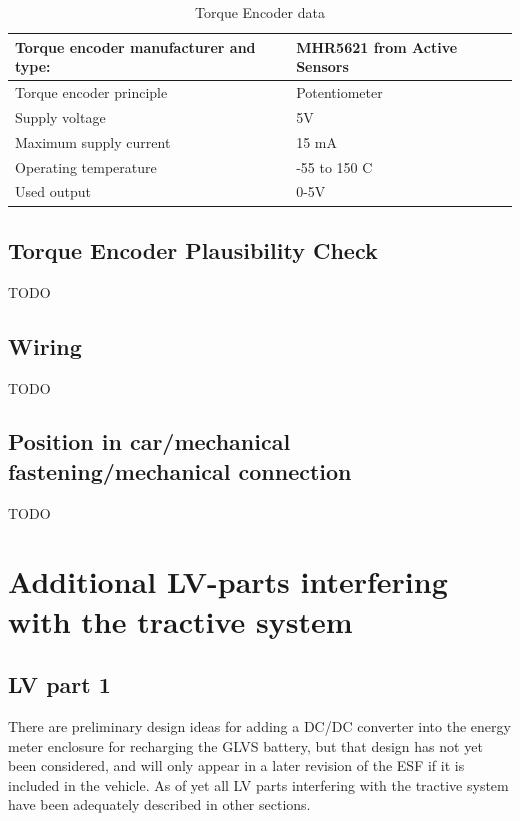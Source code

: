 \documentclass{article}
\begin{document}
\begin{table}[H]
	\centering
	\begin{tabular}{|l|l|}
	\hline
	Torque encoder manufacturer and type: & MHR5621 from Active Sensors \\ \hline
	Torque encoder principle & Potentiometer \\ \hline
	Supply voltage & 5V \\ \hline
	Maximum supply current & 15 mA \\ \hline
	Operating temperature & -55 to 150 \degree C \\ \hline
	Used output & 0-5V \\ \hline
	\end{tabular}
	\caption{Torque Encoder data}
	\label{encoder}
\end{table}

\subsection{Torque Encoder Plausibility Check}\label{torque_encoder_plausibility_check}
TODO

\subsection{Wiring}
TODO

\subsection{Position in car/mechanical fastening/mechanical connection}
TODO

\section{Additional LV-parts interfering with the tractive system}
\subsection{LV part 1}
There are preliminary design ideas for adding a DC/DC converter into the energy meter enclosure for recharging the GLVS battery, but that design has not yet been considered, and will only appear in a later revision of the ESF if it is included in the vehicle. As of yet all LV parts interfering with the tractive system have been adequately described in other sections.
\end{document}
